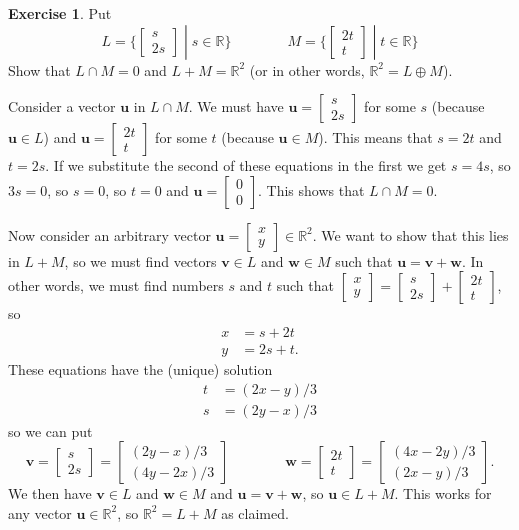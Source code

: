 \documentclass{amsart}
\newcommand{\R}         {{\mathbb{R}}}
\newcommand{\bsm}       {\left[\begin{smallmatrix}}
\newcommand{\esm}       {\end{smallmatrix}\right]}
\newcommand{\st}        {\;|\;}
\newcommand{\op}        {\oplus}
\newcommand{\vu}        {\mathbf{u}}
\newcommand{\vv}        {\mathbf{v}}
\newcommand{\vw}        {\mathbf{w}}
\renewcommand{\:}       {\colon}
\theoremstyle{definition}
\newtheorem{exercise}{Exercise}[section]
\renewenvironment{solution}{\SolutionAtEnd}{\endSolutionAtEnd}
\begin{document}
\begin{exercise}
 Put 
 \[ L = \{\bsm s \\ 2s \esm \st s\in \R\} \hspace{4em}
    M = \{\bsm 2t \\ t \esm \st t\in \R\}
 \]
 Show that $L\cap M=0$ and $L+M=\R^2$ (or in other words,
 $\R^2=L\op M$). 
\end{exercise}
\begin{solution}
 Consider a vector $\vu$ in $L\cap M$.  We
 must have $\vu=\bsm s\\2s\esm$ for some $s$ (because
 $\vu\in L$) and $\vu=\bsm 2t\\ t\esm$ for some $t$ (because
 $\vu\in M$).  This means that $s=2t$ and $t=2s$.  If we
 substitute the second of these equations in the first we
 get $s=4s$, so $3s=0$, so $s=0$, so $t=0$ and
 $\vu=\bsm 0\\0\esm$.  This shows that $L\cap M=0$. 

 Now consider an arbitrary vector
 $\vu=\bsm x\\ y\esm\in\R^2$.  We want to show that this
 lies in $L+M$, so we must find vectors $\vv\in L$ and
 $\vw\in M$ such that $\vu=\vv+\vw$.  In other words, we
 must find numbers $s$ and $t$ such that
 $\bsm x\\ y\esm=\bsm s\\ 2s\esm + \bsm 2t\\ t\esm$,
 so 
 \begin{align*}
  x &= s+2t \\
  y &= 2s+t. 
 \end{align*}
 These equations have the (unique) solution
 \begin{align*}
  t &= (2x-y)/3 \\
  s &= (2y-x)/3 
 \end{align*}
 so we can put 
 \[ \vv = \bsm s\\ 2s\esm = \bsm (2y-x)/3 \\ (4y-2x)/3 \esm 
    \hspace{4em}
    \vw = \bsm 2t\\ t\esm = \bsm (4x-2y)/3 \\ (2x-y)/3 \esm. 
 \]
 We then have $\vv\in L$ and $\vw\in M$ and $\vu=\vv+\vw$,
 so $\vu\in L+M$.  This works for any vector $\vu\in\R^2$,
 so $\R^2=L+M$ as claimed. 
\end{solution}
\end{document}
